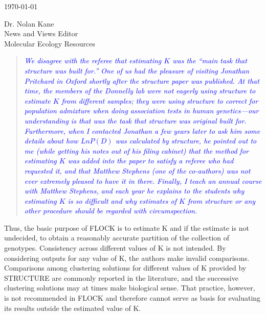 \documentclass[11pt]{letter}
\newcommand{\reply}[1]{\begin{quotation}\small\sl\textcolor{blue}{#1}\end{quotation}}
\begin{document}
\begin{letter}{ \today 

Dr. Nolan Kane\\
News and Views Editor\\
Molecular Ecology Resources \\
}
\reply{We disagree with the referee that estimating $K$ was the ``main task that {\sc structure} was
built for.''  One of us had the pleasure of visiting Jonathan Pritchard in Oxford shortly after the
{\sc structure} paper was published. At that time, the members of the Donnelly lab were not eagerly using
{\sc structure} to estimate $K$ from different samples; they were using {\sc structure} to correct
for population admixture when doing association tests in human genetics---our understanding
is {\em that} was the task that structure was original built for.  Furthermore, when I contacted
Jonathan a few years later to ask him some details about how $Ln P(D)$ was calculated by {\sc structure},
he pointed out to me (while getting his notes out of his filing cabinet) that the method for estimating
$K$ was added into the paper to satisfy a referee who had requested it, and that Matthew Stephens 
(one of the co-authors) was not ever extremely pleased to have it in there.  Finally, I teach an annual
course with Matthew Stephens, and each year he explains to the students why estimating $K$ is so
difficult and why estimates of $K$ from {\sc structure} or any other procedure should be 
regarded with circumspection.  }


Thus, the basic purpose of FLOCK is to estimate K and if the estimate is not undecided, to obtain a reasonably accurate partition of the collection of genotypes. Consistency across different values of K is not intended. By considering outputs for any value of K, the authors make invalid comparisons. Comparisons among clustering solutions for different values of K provided by STRUCTURE are commonly reported in the literature, and the successive clustering solutions may at times make biological sense. That practice, however, is not recommended in FLOCK and therefore cannot serve as basis for evaluating its results outside the estimated value of K.


\end{letter}
\end{document}
